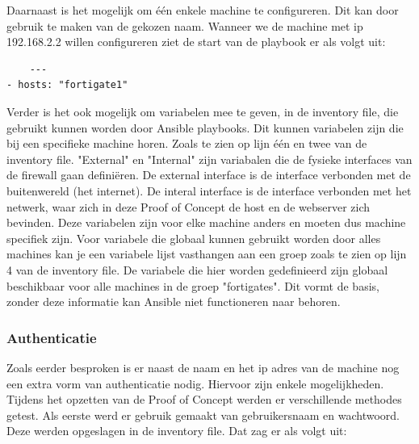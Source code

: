 Daarnaast is het mogelijk om één enkele machine te configureren. Dit kan door gebruik te maken van de gekozen naam. Wanneer we de machine met ip 192.168.2.2 willen configureren ziet de start van de playbook er als volgt uit: 

\begin{lstlisting}
    ---
- hosts: "fortigate1"

\end{lstlisting}
Verder is het ook mogelijk om variabelen mee te geven, in de inventory file, die gebruikt kunnen worden door Ansible playbooks. Dit kunnen variabelen zijn die bij een specifieke machine horen. Zoals te zien op lijn één en twee van de inventory file. "External" en "Internal" zijn variabalen die de fysieke interfaces van de firewall gaan definiëren. De external interface is de interface verbonden met de buitenwereld (het internet). De interal interface is de interface verbonden met het netwerk, waar zich in deze Proof of Concept de host en de webserver zich bevinden. Deze variabelen zijn voor elke machine anders en moeten dus machine specifiek zijn. Voor variabele die globaal kunnen gebruikt worden door alles machines kan je een variabele lijst vasthangen aan een groep zoals te zien op lijn 4 van de inventory file. De variabele die hier worden gedefinieerd zijn globaal beschikbaar voor alle machines in de groep "fortigates". Dit vormt de basis, zonder deze informatie kan Ansible niet functioneren naar behoren. 
\newpage
\subsubsection{Authenticatie}
Zoals eerder besproken is er naast de naam en het ip adres van de machine nog een extra vorm van authenticatie nodig. Hiervoor zijn enkele mogelijkheden. Tijdens het opzetten van de Proof of Concept werden er verschillende methodes getest. 
\newline
\newline
Als eerste werd er gebruik gemaakt van gebruikersnaam en wachtwoord. Deze werden opgeslagen in de inventory file. 
Dat zag er als volgt uit: 

